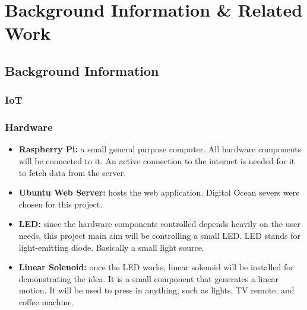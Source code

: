 \documentclass[a4paper, 12pt, oneside]{book}
\newcommand\boldcolor[1]{\textcolor{bold}{\textbf{#1}}}
\begin{document}
		\chapter{Background Information \& Related Work}
			\section{Background Information}
			\subsection{IoT}
			\subsection{Hardware}
				\begin{itemize}
				\item \boldcolor{Raspberry Pi:} a small general purpose computer. All hardware components will be connected to it. An active connection to the internet is needed for it to fetch data from the server. %
				\item \boldcolor{Ubuntu Web Server:} hosts the web application. Digital Ocean severs were chosen for this project.
				
				\item \boldcolor{LED:} since the hardware components controlled depends heavily on the user needs, this project main aim will be controlling a small LED. LED stands for light-emitting diode. Basically a small light source. %
				\item \boldcolor{Linear Solenoid:} once the LED works, linear solenoid will be installed for demonstrating the idea. It is a small component that generates a linear motion. It will be used to press in anything, such as lights, TV remote, and coffee machine. %
				\end{itemize}
				
\end{document}
